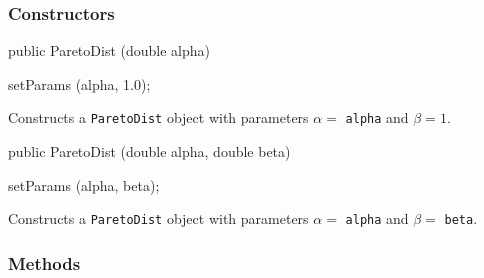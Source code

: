 \subsubsection* {Constructors}

\begin{code}

   public ParetoDist (double alpha)\begin{hide} {
      setParams (alpha, 1.0);
   }\end{hide}
\end{code}
  \begin{tabb} Constructs a \texttt{ParetoDist} object with parameters $\alpha =$
        \texttt{alpha} and $\beta = 1$.
  \end{tabb}
\begin{code}

   public ParetoDist (double alpha, double beta)\begin{hide} {
      setParams (alpha, beta);
   }\end{hide}
\end{code}
  \begin{tabb} Constructs a \texttt{ParetoDist} object with parameters $\alpha =$
        \texttt{alpha} and $\beta = $ \texttt{beta}.
  \end{tabb}

\subsubsection* {Methods}

